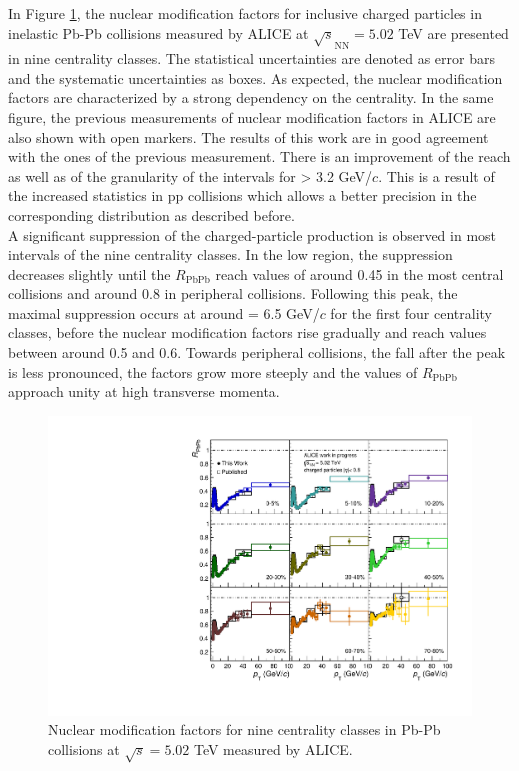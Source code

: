 \documentclass[12pt,a4paper]{report}
\begin{document}
In Figure \ref{Raa}, the nuclear modification factors for inclusive charged particles in inelastic Pb-Pb collisions measured by ALICE at $\sqrt{s}_\text{NN}=5.02$ TeV are presented in nine centrality classes. The statistical uncertainties are denoted as error bars and the systematic uncertainties as boxes. As expected, the nuclear modification factors are characterized by a strong dependency on the centrality. In the same figure, the previous measurements of nuclear modification factors in ALICE are also shown with open markers. The results of this work are in good agreement with the ones of the previous measurement. There is an improvement of the \pt reach as well as of the granularity of the intervals for \pt > 3.2 GeV/$c$. This is a result of the increased statistics in pp collisions which allows a better precision in the corresponding \pt distribution as described before.\\
A significant suppression of the charged-particle production is observed in most \pt intervals of the nine centrality classes. In the low \pt region, the suppression decreases slightly until the $R_\text{PbPb}$ reach values of around 0.45 in the most central collisions and around 0.8 in peripheral collisions. Following this peak, the maximal suppression occurs at around \pt = 6.5 GeV/$c$ for the first four centrality classes, before the nuclear modification factors rise gradually and reach values between around 0.5 and 0.6. Towards peripheral collisions, the fall after the peak is less pronounced, the factors grow more steeply and the values of $R_\text{PbPb}$ approach unity at high transverse momenta. 
\begin{figure}[tb!]
\centering
\includegraphics[width=15.5cm]{Plots/Raa.pdf}  
\caption{Nuclear modification factors for nine centrality classes in Pb-Pb collisions at $\sqrt{s}=5.02$ TeV measured by ALICE.}
\label{Raa}
\end{figure}
\end{document}
